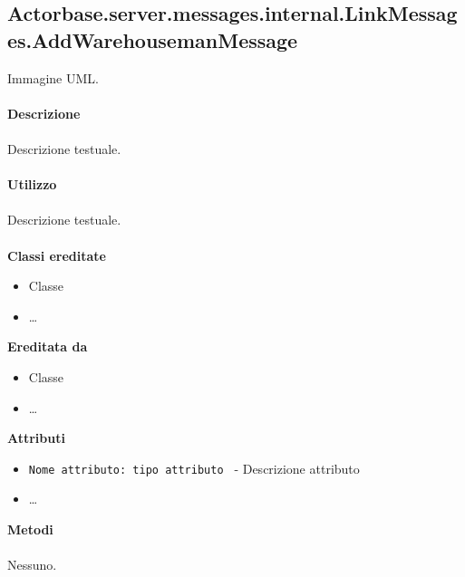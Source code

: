 \documentclass[a4paper]{article}
\begin{document}
	\subsection{Actorbase.server.messages.internal.LinkMessages.AddWarehousemanMessage}
		Immagine UML.
		\\ \\
		\textbf{Descrizione}
			\\ \\
			Descrizione testuale.
			\\ \\
		\textbf{Utilizzo}
			\\ \\
			Descrizione testuale.
			\\ \\
		\textbf{Classi ereditate}
			\begin{itemize}
				\item Classe
				\item \dots
			\end{itemize}
		\textbf{Ereditata da}
			\begin{itemize}
				\item Classe
				\item \dots
			\end{itemize}
		\textbf{Attributi}
			\begin{itemize}
				\item \texttt{Nome attributo: tipo attributo } - Descrizione attributo
				\item \dots
			\end{itemize}
		\textbf{Metodi}
			\\ \\
			Nessuno.
			
\end{document}
